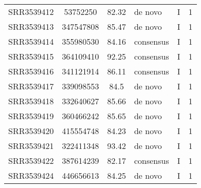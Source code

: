 \begin{scriptsize}
\begin{center}
\begin{longtable}{@{}lcclcc@{}}
SRR3539412 & 53752250      & 82.32       & de novo      & I        & 1        \\
SRR3539413 & 347547808     & 85.47       & de novo      & I        & 1        \\
SRR3539414 & 355980530     & 84.16       & consensus    & I        & 1        \\
SRR3539415 & 364109410     & 92.25       & consensus    & I        & 1        \\
SRR3539416 & 341121914     & 86.11       & consensus    & I        & 1        \\
SRR3539417 & 339098553     & 84.5        & de novo      & I        & 1        \\
SRR3539418 & 332640627     & 85.66       & de novo      & I        & 1        \\
SRR3539419 & 360466242     & 85.65       & de novo      & I        & 1        \\
SRR3539420 & 415554748     & 84.23       & de novo      & I        & 1        \\
SRR3539421 & 322411348     & 93.42       & de novo      & I        & 1        \\
SRR3539422 & 387614239     & 82.17       & consensus    & I        & 1        \\
SRR3539424 & 446656613     & 84.25       & de novo      & I        & 1  
\end{longtable}

\end{center}
\end{scriptsize}